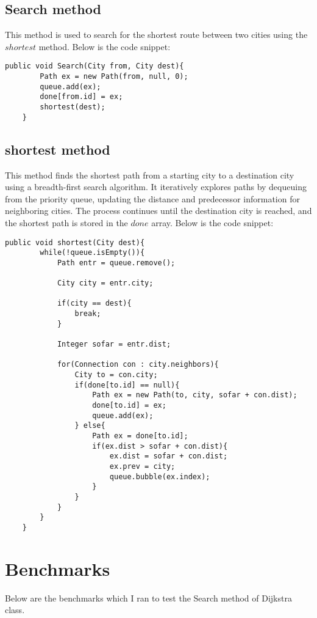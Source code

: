 \documentclass[a4paper,11pt]{article}
\begin{document}
\subsection*{Search method}
This method is used to search for the shortest route between two cities using the $shortest$ method. Below is the code snippet:

\begin{verbatim}
public void Search(City from, City dest){
        Path ex = new Path(from, null, 0);
        queue.add(ex);
        done[from.id] = ex;
        shortest(dest);
    }
\end{verbatim}

\subsection*{shortest method}
This method finds the shortest path from a starting city to a destination city using a breadth-first search algorithm. It iteratively explores paths by dequeuing from the priority queue, updating the distance and predecessor information for neighboring cities. The process continues until the destination city is reached, and the shortest path is stored in the $done$ array.  Below is the code snippet:

\begin{verbatim}
public void shortest(City dest){
        while(!queue.isEmpty()){
            Path entr = queue.remove();

            City city = entr.city;

            if(city == dest){
                break;
            }

            Integer sofar = entr.dist;

            for(Connection con : city.neighbors){
                City to = con.city;
                if(done[to.id] == null){
                    Path ex = new Path(to, city, sofar + con.dist);
                    done[to.id] = ex;
                    queue.add(ex);
                } else{
                    Path ex = done[to.id];
                    if(ex.dist > sofar + con.dist){
                        ex.dist = sofar + con.dist;
                        ex.prev = city;
                        queue.bubble(ex.index);
                    }
                }
            }
        }
    }
\end{verbatim}


\section*{Benchmarks}
Below are the benchmarks which I ran to test the Search method of Dijkstra class. 
\end{document}
